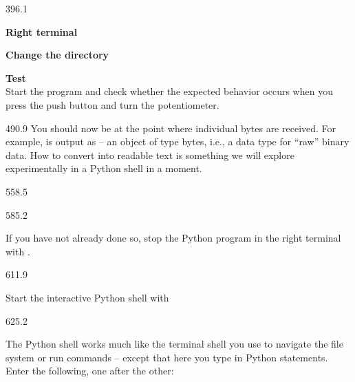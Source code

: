 \documentclass{aslab}
\begin{document}
\begin{region}[pitch=13.65]{396.1}
\begin{tasks}[start=2]
\item \textbf{Right terminal}
  \begin{letters}[label={\bfseries\Alph*)}]
  \item \textbf{Change the directory}\\
  \item \textbf{Test}\\
    Start the program and check whether the expected behavior occurs when
    you press the push button and turn the potentiometer.
  \end{letters}
\end{tasks}
\end{region}

\begin{region}[pitch=13.5]{490.9}
You should now be at the point where individual bytes are received. For
example,  is output as  -- an object of type bytes, i.e.,
a data type for ``raw'' binary data. How to convert  into readable
text is something we will explore experimentally in a Python shell in a
moment.
\end{region}

\begin{region}{558.5}
\end{region}

\begin{region}[pitch=13.3]{585.2}
\begin{tasks}
\item If you have not already done so, stop the Python program in the
  right terminal with .
\end{tasks}
\end{region}

\begin{region}{611.9}
\begin{tasks}[start=2]
\item Start the interactive Python shell with 
\end{tasks}
\end{region}

\begin{region}[pitch=13.2]{625.2}
\begin{tasks}[start=3]
\item The Python shell works much like the terminal shell you use to
  navigate the file system or run commands -- except that here you type in
  Python statements.
  \blank
  Enter the following, one after the other:
  \begin{inputs}
  \item {}
  \item {}
  \item {}
  \item {}
  \item {}
  \end{inputs}
\end{tasks}
\end{region}
\end{document}

